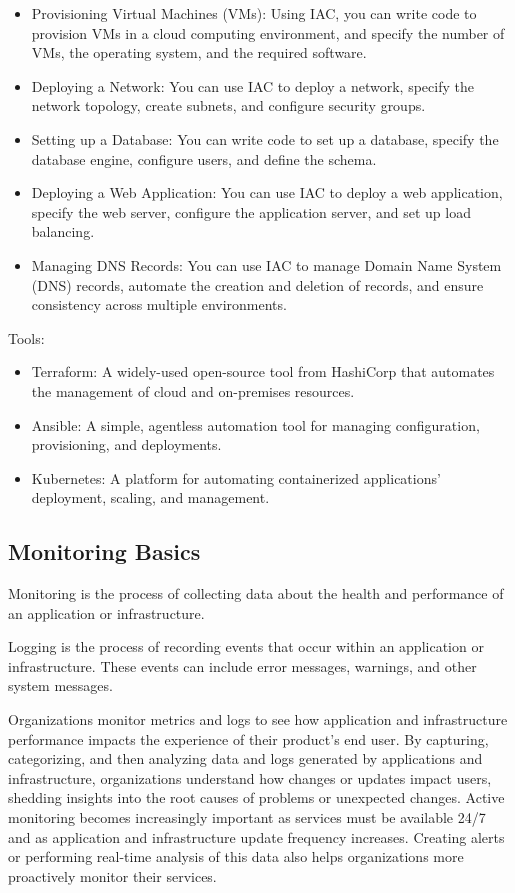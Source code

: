 \documentclass[12pt]{book}
\begin{document}
\begin{itemize}
    \item Provisioning Virtual Machines (VMs): Using IAC, you can write code to provision VMs in a cloud computing environment, and specify the number of VMs, the operating system, and the required software.
    \item Deploying a Network: You can use IAC to deploy a network, specify the network topology, create subnets, and configure security groups.
    \item Setting up a Database: You can write code to set up a database, specify the database engine, configure users, and define the schema.
    \item Deploying a Web Application: You can use IAC to deploy a web application, specify the web server, configure the application server, and set up load balancing.
    \item Managing DNS Records: You can use IAC to manage Domain Name System (DNS) records, automate the creation and deletion of records, and ensure consistency across multiple environments. 
\end{itemize}

Tools:
\begin{itemize}
    \item Terraform: A widely-used open-source tool from HashiCorp that automates the management of cloud and on-premises resources.
    \item Ansible: A simple, agentless automation tool for managing configuration, provisioning, and deployments.
	\item Kubernetes: A platform for automating containerized applications' deployment, scaling, and management.
\end{itemize}

\subsection{Monitoring Basics}
Monitoring is the process of collecting data about the health and performance of an application or infrastructure. 

Logging is the process of recording events that occur within an application or infrastructure. These events can include error messages, warnings, and other system messages.

Organizations monitor metrics and logs to see how application and infrastructure performance impacts the experience of their product's end user. 
By capturing, categorizing, and then analyzing data and logs generated by applications and infrastructure, organizations understand how changes or updates impact users, shedding insights into the root causes of problems or unexpected changes. 
Active monitoring becomes increasingly important as services must be available 24/7 and as application and infrastructure update frequency increases. Creating alerts or performing real-time analysis of this data also helps organizations more proactively monitor their services.
\end{document}
